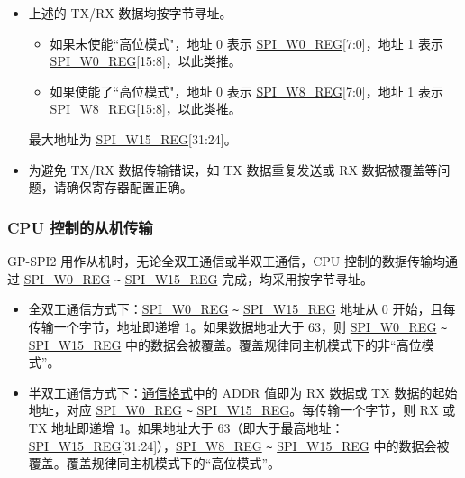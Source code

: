 \documentclass[main\_\_CN.tex]{subfiles}
\begin{document}
\begin{tiplisting}
\vspace{-2em}
\begin{itemize}
    \item 上述的 TX/RX 数据均按字节寻址。
    \begin{itemize}
        \item 如果未使能``高位模式"，地址 0 表示 \hyperref[regdesc:SPIW0REG]{SPI\_W0\_REG}[7:0]，地址 1 表示 \hyperref[regdesc:SPIW0REG]{SPI\_W0\_REG}[15:8]，以此类推。
        \item 如果使能了``高位模式"，地址 0 表示 \hyperref[regdesc:SPIW0REG]{SPI\_W8\_REG}[7:0]，地址 1 表示 \hyperref[regdesc:SPIW0REG]{SPI\_W8\_REG}[15:8]，以此类推。
    \end{itemize}
    最大地址为 \hyperref[regdesc:SPIW0REG]{SPI\_W15\_REG}[31:24]。
    \item 为避免 TX/RX 数据传输错误，如 TX 数据重复发送或 RX 数据被覆盖等问题，请确保寄存器配置正确。
\end{itemize}
\end{tiplisting}

\subsubsection{CPU 控制的从机传输} \label{para:cpu-controlled-slave-transfer}

GP-SPI2 用作从机时，无论全双工通信或半双工通信，CPU 控制的数据传输均通过 \hyperref[regdesc:SPIW0REG]{SPI\_W0\_REG} \verb+~+ \hyperref[regdesc:SPIW0REG]{SPI\_W15\_REG} 完成，均采用按字节寻址。

\begin{itemize}
    \item 全双工通信方式下：\hyperref[regdesc:SPIW0REG]{SPI\_W0\_REG} \verb+~+ \hyperref[regdesc:SPIW0REG]{SPI\_W15\_REG} 地址从 0 开始，且每传输一个字节，地址即递增 1。如果数据地址大于 63，则 \hyperref[regdesc:SPIW0REG]{SPI\_W0\_REG} \verb+~+ \hyperref[regdesc:SPIW0REG]{SPI\_W15\_REG} 中的数据会被覆盖。覆盖规律同主机模式下的非“高位模式”。
    \item 半双工通信方式下：\hyperref[para:spi-slave-comm-format]{通信格式}中的 ADDR 值即为 RX 数据或 TX 数据的起始地址，对应 \hyperref[regdesc:SPIW0REG]{SPI\_W0\_REG} \verb+~+ \hyperref[regdesc:SPIW0REG]{SPI\_W15\_REG}。每传输一个字节，则 RX 或 TX 地址即递增 1。如果地址大于 63（即大于最高地址：\hyperref[regdesc:SPIW0REG]{SPI\_W15\_REG}[31:24]），\hyperref[regdesc:SPIW0REG]{SPI\_W8\_REG} \verb+~+ \hyperref[regdesc:SPIW0REG]{SPI\_W15\_REG} 中的数据会被覆盖。覆盖规律同主机模式下的“高位模式”。
\end{itemize}
\end{document}
